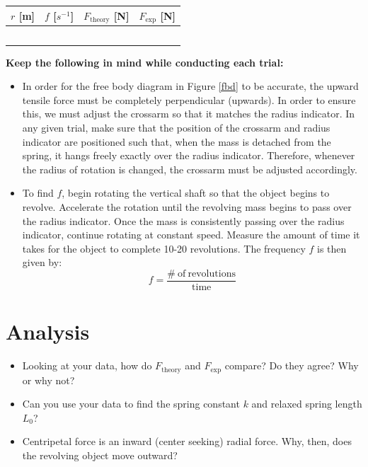 \documentclass{article}
\begin{document}
\begin{center}
\begin{tabular}{|c|c|c|c|}
	\hline
	$r$ [m]&$f$ [$s^{-1}$]&$F_\mathrm{theory}$ [N]&$F_\mathrm{exp}$ [N]\\
	\hline
	&&&\\
	\hline
	&&&\\
	\hline
	&&&\\
	\hline
	&&&\\
	\hline
	&&&\\
	\hline
\end{tabular}
\end{center}
\textbf{Keep the following in mind while conducting each trial:}
\begin{itemize}
	\item In order for the free body diagram in Figure \ref{fbd} to be accurate, the upward tensile force must be completely perpendicular (upwards). In order to ensure this, we must adjust the crossarm so that it matches the radius indicator. In any given trial, make sure that the position of the crossarm and radius indicator are positioned such that, when the mass is detached from the spring, it hangs freely exactly over the radius indicator. Therefore, whenever the radius of rotation is changed, the crossarm must be adjusted accordingly.
	\item To find $f$, begin rotating the vertical shaft so that the object begins to revolve.  Accelerate the rotation until the revolving mass begins to pass over the radius indicator. Once the mass is consistently passing over the radius indicator, continue rotating at constant speed.  Measure the amount of time it takes for the object to complete 10-20 revolutions.  The frequency $f$ is then given by: 
	\begin{equation}
		f=\frac{\mathrm{\# \ of\  revolutions}}{\mathrm{time}}
	\end{equation}
\end{itemize}
\section*{Analysis}
\begin{itemize}
	\item Looking at your data, how do $F_\mathrm{theory}$ and $F_\mathrm{exp}$ compare? Do they agree? Why or why not?
	\item Can you use your data to find the spring constant $k$ and relaxed spring length $L_0$?
	\item Centripetal force is an inward (center seeking) radial force. Why, then, does the revolving object move outward?
\end{itemize}
\end{document}
